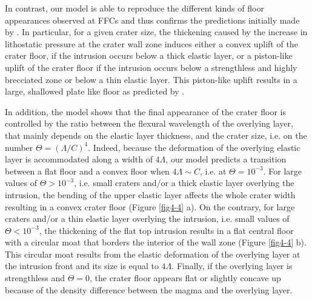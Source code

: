 \begin{article}
        In  contrast, our  model is  able to  reproduce the  different
        kinds of floor appearances observed  at FFCs and thus confirms
        the  predictions  initially  made by  \citet{Schultz1976}.  In
        particular, for a given crater  size, the thickening caused by
        the increase in  lithostatic pressure at the  crater wall zone
        induces either  a convex  uplift of the  crater floor,  if the
        intrusion occurs below a thick elastic layer, or a piston-like
        uplift of  the crater  floor if the  intrusion occurs  below a
        strengthless  and  highly  brecciated  zone or  below  a  thin
        elastic  layer. This  piston-like uplift  results in  a large,
        shallowed    plate     like    floor    as     predicted    by
        \citet{Schultz1976}.
	
        In addition, the model shows  that the final appearance of the
        crater floor is  controlled by the ratio  between the flexural
        wavelength of the overlying layer,  that mainly depends on the
        elastic  layer thickness,  and the  crater size,  i.e. on  the
        number $\Theta=(\Lambda/C)^4$. Indeed, because the deformation
        of the overlying  elastic layer is accommodated  along a width
        of $4\Lambda$, our model predicts  a transition between a flat
        floor  and  a convex  floor  when  $4\Lambda\sim C$,  i.e.  at
        $\Theta=10^{-3}$.  For   large  values   of  $\Theta>10^{-3}$,
        i.e. small craters and/or a  thick elastic layer overlying the
        intrusion, the bending of the  upper elastic layer affects the
        whole crater width resulting in  a convex crater floor (Figure
        \ref{fig4-4} a). On  the contrary, for large  craters and/or a
        thin elastic layer overlying  the intrusion, i.e. small values
        of $\Theta<10^{-3}$, the thickening  of the flat top intrusion
        results  in a  flat central  floor with  a circular  moat that
        borders  the interior  of the  wall zone  (Figure \ref{fig4-4}
        b). This circular moat results from the elastic deformation of
        the overlying  layer at  the intrusion front  and its  size is
        equal  to  $4\Lambda$.  Finally,  if the  overlying  layer  is
        strengthless and $\Theta=0$, the  crater floor appears flat or
        slightly concave up because  of the density difference between
        the magma and the overlying layer.
	

\end{article}

